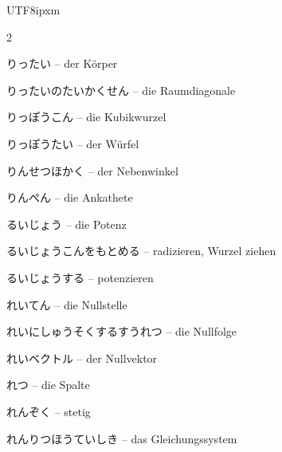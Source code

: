 \begin{CJK}{UTF8}{ipxm}
\begin{multicols}{2}
\par\nopagebreak
{} {\footnotesize\color{black!70}りったい} -- der Körper\dotfill\hyperref[e:225]{\pageref*{e:225}}\par
{} {\footnotesize\color{black!70}りったいのたいかくせん} -- die Raumdiagonale\dotfill\hyperref[e:252]{\pageref*{e:252}}\par
{} {\footnotesize\color{black!70}りっぽうこん} -- die Kubikwurzel\dotfill\hyperref[e:46]{\pageref*{e:46}}\par
{} {\footnotesize\color{black!70}りっぽうたい} -- der Würfel\dotfill\hyperref[e:226]{\pageref*{e:226}}\par
{} {\footnotesize\color{black!70}りんせつほかく} -- der Nebenwinkel\dotfill\hyperref[e:163]{\pageref*{e:163}}\par
{} {\footnotesize\color{black!70}りんぺん} -- die Ankathete\dotfill\hyperref[e:188]{\pageref*{e:188}}\par
{} {\footnotesize\color{black!70}るいじょう} -- die Potenz\dotfill\hyperref[e:42]{\pageref*{e:42}}\par
{} {\footnotesize\color{black!70}るいじょうこんをもとめる} -- radizieren, Wurzel ziehen\dotfill\hyperref[e:52]{\pageref*{e:52}}\par
{} {\footnotesize\color{black!70}るいじょうする} -- potenzieren\dotfill\hyperref[e:50]{\pageref*{e:50}}\par
{} {\footnotesize\color{black!70}れいてん} -- die Nullstelle\dotfill\hyperref[e:122]{\pageref*{e:122}}\par
{} {\footnotesize\color{black!70}れいにしゅうそくするすうれつ} -- die Nullfolge\dotfill\hyperref[e:258]{\pageref*{e:258}}\par
{} {\footnotesize\color{black!70}れいベクトル} -- der Nullvektor\dotfill\hyperref[e:304]{\pageref*{e:304}}\par
{} {\footnotesize\color{black!70}れつ} -- die Spalte\dotfill\hyperref[e:323]{\pageref*{e:323}}\par
{} {\footnotesize\color{black!70}れんぞく} -- stetig\dotfill\hyperref[e:268]{\pageref*{e:268}}\par
{} {\footnotesize\color{black!70}れんりつほうていしき} -- das Gleichungssystem\dotfill\hyperref[e:80]{\pageref*{e:80}}\par


\end{multicols}
\end{CJK}
